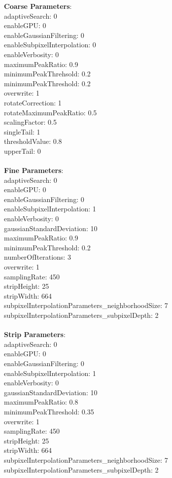 \documentclass[11pt]{article}
\begin{document}
\textbf{Coarse Parameters}: \\
adaptiveSearch: 0\\
enableGPU: 0\\
enableGaussianFiltering: 0\\
enableSubpixelInterpolation: 0\\
enableVerbosity: 0\\
maximumPeakRatio: 0.9\\
minimumPeakThrehsold: 0.2\\
minimumPeakThreshold: 0.2\\
overwrite: 1\\
rotateCorrection: 1\\
rotateMaximumPeakRatio: 0.5\\
scalingFactor: 0.5\\
singleTail: 1\\
thresholdValue: 0.8\\
upperTail: 0\\
\\
\textbf{Fine Parameters}: \\
adaptiveSearch: 0\\
enableGPU: 0\\
enableGaussianFiltering: 0\\
enableSubpixelInterpolation: 1\\
enableVerbosity: 0\\
gaussianStandardDeviation: 10\\
maximumPeakRatio: 0.9\\
minimumPeakThreshold: 0.2\\
numberOfIterations: 3\\
overwrite: 1\\
samplingRate: 450\\
stripHeight: 25\\
stripWidth: 664\\
subpixelInterpolationParameters\_neighborhoodSize: 7\\
subpixelInterpolationParameters\_subpixelDepth: 2\\
\\
\textbf{Strip Parameters}: \\
adaptiveSearch: 0\\
enableGPU: 0\\
enableGaussianFiltering: 0\\
enableSubpixelInterpolation: 1\\
enableVerbosity: 0\\
gaussianStandardDeviation: 10\\
maximumPeakRatio: 0.8\\
minimumPeakThreshold: 0.35\\
overwrite: 1\\
samplingRate: 450\\
stripHeight: 25\\
stripWidth: 664\\
subpixelInterpolationParameters\_neighborhoodSize: 7\\
subpixelInterpolationParameters\_subpixelDepth: 2\\
\\
\newpage
\end{document}
